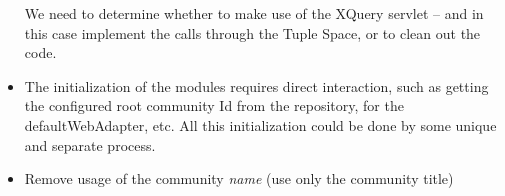 \documentclass[titlepage]{article}%
\begin{document}
\begin{itemize}
We need to determine whether to make use of the XQuery servlet -- and in this case implement the calls through the Tuple Space, or to clean out the code.
\item The initialization of the modules requires direct interaction, such as getting the configured root community Id from the repository, for the defaultWebAdapter, etc. All this initialization could be done by some unique and separate process.

\item Remove usage of the community \emph{name} (use only the community title)
\end{itemize}
\end{document}
